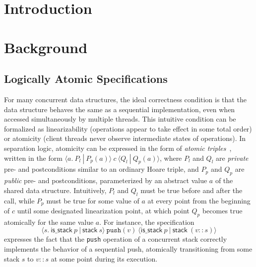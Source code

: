 \documentclass[runningheads]{llncs}
\begin{document}
\section{Introduction}


\section{Background}
\label{background}

\subsection{Logically Atomic Specifications}
\label{atomic}

For many concurrent data structures, the ideal correctness condition is that the data structure behaves the same as a sequential implementation, even when accessed simultaneously by multiple threads. This intuitive condition can be formalized as linearizability (operations appear to take effect in some total order) or atomicity (client threads never observe intermediate states of operations). In separation logic, atomicity can be expressed in the form of \emph{atomic triples}~\cite{tada}, written in the form $\langle a.\ P_l\ |\ P_p(a)\rangle\ c\ \langle Q_l\ |\ Q_p(a)\rangle$, where $P_l$ and $Q_l$ are \emph{private} pre- and postconditions similar to an ordinary Hoare triple, and $P_p$ and $Q_p$ are \emph{public} pre- and postconditions, parameterized by an abstract value $a$ of the shared data structure. %
Intuitively, $P_l$ and $Q_l$ must be true before and after the call, while $P_p$ must be true for some value of $a$ at every point from the beginning of $c$ until some designated linearization point, at which point $Q_p$ becomes true atomically for the same value $a$. For instance, the specification $$\langle s.\ \mathsf{is\_stack}\ p\ |\ \mathsf{stack}\ s\rangle\ \texttt{push}(v)\ \langle \mathsf{is\_stack}\ p\ |\ \mathsf{stack}\ (v :: s)\rangle$$ expresses the fact that the \texttt{push} operation of a concurrent stack correctly implements the behavior of a sequential push, atomically transitioning from some stack $s$ to $v :: s$ at some point during its execution. %
\end{document}
